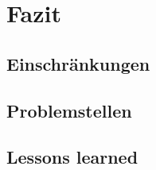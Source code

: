 \documentclass[ngerman, 12pt, pdftex]{scrartcl}[2006/07/30]
\begin{document}

\section{Fazit}
\subsection{Einschränkungen}

\subsection{Problemstellen}

\subsection{Lessons learned}


\end{document}

